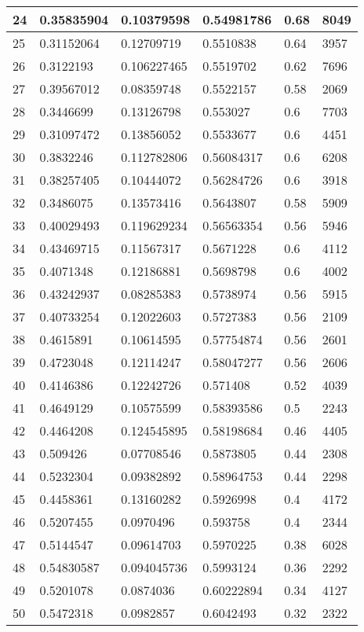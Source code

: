 \begin{longtable}{|l|l|l|l|l|l|}
24 & 0.35835904 & 0.10379598 & 0.54981786 & 0.68 & 8049 \\ \hline 
25 & 0.31152064 & 0.12709719 & 0.5510838 & 0.64 & 3957 \\ \hline 
26 & 0.3122193 & 0.106227465 & 0.5519702 & 0.62 & 7696 \\ \hline 
27 & 0.39567012 & 0.08359748 & 0.5522157 & 0.58 & 2069 \\ \hline 
28 & 0.3446699 & 0.13126798 & 0.553027 & 0.6 & 7703 \\ \hline 
29 & 0.31097472 & 0.13856052 & 0.5533677 & 0.6 & 4451 \\ \hline 
30 & 0.3832246 & 0.112782806 & 0.56084317 & 0.6 & 6208 \\ \hline 
31 & 0.38257405 & 0.10444072 & 0.56284726 & 0.6 & 3918 \\ \hline 
32 & 0.3486075 & 0.13573416 & 0.5643807 & 0.58 & 5909 \\ \hline 
33 & 0.40029493 & 0.119629234 & 0.56563354 & 0.56 & 5946 \\ \hline 
34 & 0.43469715 & 0.11567317 & 0.5671228 & 0.6 & 4112 \\ \hline 
35 & 0.4071348 & 0.12186881 & 0.5698798 & 0.6 & 4002 \\ \hline 
36 & 0.43242937 & 0.08285383 & 0.5738974 & 0.56 & 5915 \\ \hline 
37 & 0.40733254 & 0.12022603 & 0.5727383 & 0.56 & 2109 \\ \hline 
38 & 0.4615891 & 0.10614595 & 0.57754874 & 0.56 & 2601 \\ \hline 
39 & 0.4723048 & 0.12114247 & 0.58047277 & 0.56 & 2606 \\ \hline 
40 & 0.4146386 & 0.12242726 & 0.571408 & 0.52 & 4039 \\ \hline 
41 & 0.4649129 & 0.10575599 & 0.58393586 & 0.5 & 2243 \\ \hline 
42 & 0.4464208 & 0.124545895 & 0.58198684 & 0.46 & 4405 \\ \hline 
43 & 0.509426 & 0.07708546 & 0.5873805 & 0.44 & 2308 \\ \hline 
44 & 0.5232304 & 0.09382892 & 0.58964753 & 0.44 & 2298 \\ \hline 
45 & 0.4458361 & 0.13160282 & 0.5926998 & 0.4 & 4172 \\ \hline 
46 & 0.5207455 & 0.0970496 & 0.593758 & 0.4 & 2344 \\ \hline 
47 & 0.5144547 & 0.09614703 & 0.5970225 & 0.38 & 6028 \\ \hline 
48 & 0.54830587 & 0.094045736 & 0.5993124 & 0.36 & 2292 \\ \hline 
49 & 0.5201078 & 0.0874036 & 0.60222894 & 0.34 & 4127 \\ \hline 
50 & 0.5472318 & 0.0982857 & 0.6042493 & 0.32 & 2322 \\ \hline 
\end{longtable}